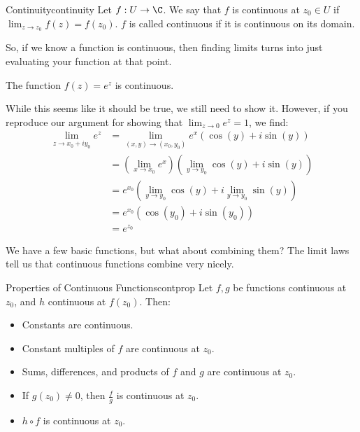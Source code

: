 \begin{defbo}{Continuity}{continuity}
Let $f:U\rightarrow \C$. We say that $f$ is continuous at $z_0 \in U$ if $\lim_{z\rightarrow z_0} f(z) = f(z_0)$. $f$ is called continuous if it is continuous on its domain.
\end{defbo}

So, if we know a function is continuous, then finding limits turns into just evaluating your function at that point.

\begin{ex}{}{} The function $f(z) = e^z$ is continuous.

While this seems like it should be true, we still need to show it. However, if you reproduce our argument for showing that $\lim_{z\rightarrow 0} e^z = 1$, we find:
\begin{align*}\lim_{z\rightarrow x_0 + iy_0} e^z &= \lim_{(x,y) \rightarrow (x_0,y_0)} e^x(\cos(y) + i\sin(y))\\
&= \left(\lim_{x\rightarrow x_0}e^x\right)\left( \lim_{y\rightarrow y_0} \cos(y) + i\sin(y)\right)\\
&= e^{x_0}\left( \lim_{y\rightarrow y_0} \cos(y) + i\lim_{y\rightarrow y_0}\sin(y)\right)\\
&= e^{x_0}(\cos(y_0) + i\sin(y_0))\\
&= e^{z_0}
\end{align*}

\end{ex}


We have a few basic functions, but what about combining them? The limit laws tell us that continuous functions combine very nicely.

\begin{thmbo}{Properties of Continuous Functions}{contprop}
Let $f,g$ be functions continuous at $z_0$, and $h$ continuous at $f(z_0)$. Then:

\begin{itemize}
\item Constants are continuous.
\item Constant multiples of $f$ are continuous at $z_0$.
\item Sums, differences, and products of $f$ and $g$ are continuous at $z_0$.
\item If $g(z_0)\ne 0$, then $\frac{f}{g}$ is continuous at $z_0$.
\item $h\circ f$ is continuous at $z_0$.
\end{itemize}
\end{thmbo}


